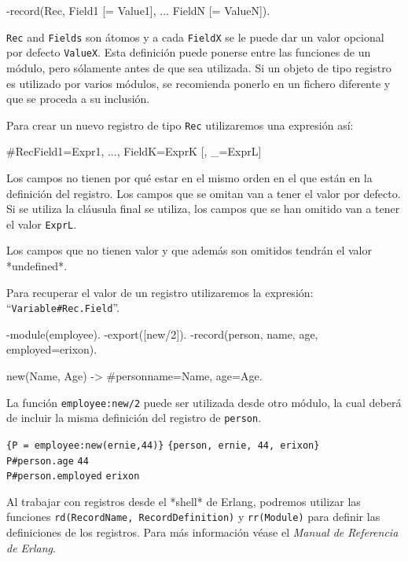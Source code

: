 \begin{erlang}
-record(Rec, {Field1 [= Value1],
              ...
              FieldN [= ValueN]}).
\end{erlang}

\texttt{Rec} and \texttt{Fields} son \'atomos y a cada \texttt{FieldX}
se le puede dar un valor opcional por defecto \texttt{ValueX}. Esta definici\'on puede ponerse
entre las funciones de un m\'odulo, pero s\'olamente antes de que sea utilizada. Si un objeto de tipo 
registro es utilizado por varios m\'odulos, se recomienda ponerlo en un fichero diferente y que se proceda
a su inclusi\'on.

Para crear un nuevo registro de tipo \texttt{Rec} utilizaremos una expresi\'on as\'i:

\begin{erlang}
#Rec{Field1=Expr1, ..., FieldK=ExprK [, _=ExprL]}
\end{erlang}
Los campos no tienen por qué estar en el mismo orden en el que están en la definición 
del registro. Los campos que se omitan van a tener el valor por defecto. Si se utiliza
la cláusula final se utiliza, los campos que se han omitido van a tener el valor \texttt{ExprL}.

Los campos que no tienen valor y que además son omitidos tendrán el valor *undefined*. 

Para recuperar el valor de un registro utilizaremos la expresión: 
``\texttt{Variable\#Rec.Field}''.

\begin{erlang}
-module(employee).
-export([new/2]).
-record(person, {name, age, employed=erixon}).

new(Name, Age) -> #person{name=Name, age=Age}.
\end{erlang}

La función \texttt{employee:new/2} puede ser utilizada desde otro módulo, la cual deberá
de incluir la misma definición del registro de \texttt{person}.

\texttt{\{P = employee:new(ernie,44)\}} \resultingin \texttt{\{person, ernie, 44,
erixon\}} \\
\texttt{P\#person.age} \resultingin \texttt{44} \\
\texttt{P\#person.employed} \resultingin \texttt{erixon}

Al trabajar con registros desde el *shell* de Erlang, podremos utilizar las funciones \texttt{rd(RecordName, RecordDefinition)} y \texttt{rr(Module)}
para definir las definiciones de los registros. Para más información véase el \textit{Manual de Referencia de Erlang}.


